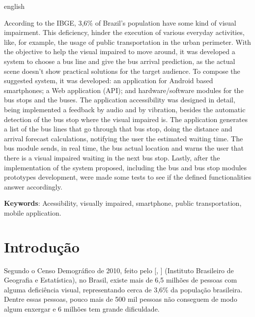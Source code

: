 \documentclass[
	12pt,				%
	oneside,			%
	a4paper,			%
	brazil				%
]{abntex2}
\newcommand{\citecustom}[1]{[\citeauthoronline{#1}, \citeyear{#1}]}
\newcommand*{\BeginNoToc}{%
  \addtocontents{toc}{%
    \edef\protect\SavedTocDepth{\protect\the\protect\value{tocdepth}}%
  }%
  \addtocontents{toc}{%
    \protect\setcounter{tocdepth}{-10}%
  }%
}
\newcommand*{\EndNoToc}{%
  \addtocontents{toc}{%
    \protect\setcounter{tocdepth}{\protect\SavedTocDepth}%
  }%
}
\begin{document}
\begin{resumo}[Abstract] 
\begin{otherlanguage*}{english}

According to the IBGE, 3,6\% of Brazil's population have some kind of visual impairment. This deficiency, hinder the execution of various everyday activities, like, for example, the usage of public transportation in the urban perimeter. With the objective to help the visual impaired to move around, it was developed a system to choose a bus line and give the bus arrival prediction, as the actual scene doesn't show practical solutions for the target audience. To compose the suggested system, it was developed: an application for Android based smartphones; a Web application (API); and hardware/software modules for the bus stops and the buses. The application accessibility was designed in detail, being implemented
a feedback by audio and by vibration, besides the automatic detection of the bus stop where the visual impaired is. The application generates a list of the bus lines that go through that bus stop, doing the distance and arrival forecast calculations, notifying the user the estimated waiting time. The bus module sends, in real time, the bus actual location and warns the user that there is a visual impaired waiting in the next bus stop. Lastly, after the implementation of the system proposed, including the bus and bus stop modules prototypes development, were made some tests to see if the defined functionalities answer accordingly.

\vspace{\onelineskip} 
\noindent \textbf{Keywords}: Acessibility, visually impaired, smartphone, public transportation, mobile application. 
\end{otherlanguage*} 
\end{resumo} 

\BeginNoToc
\tableofcontents*
\EndNoToc

\newpage

\listoffigures\thispagestyle{empty} \newpage

\textual

\chapter{Introdução}

Segundo o Censo Demográfico de 2010, feito pelo \citecustom{ibge} (Instituto Brasileiro de Geografia e Estatística), no Brasil, existe mais de 6,5 milhões de pessoas com alguma deficiência visual, representando cerca de 3,6\% da população brasileira. Dentre essas pessoas, pouco mais de 500 mil pessoas não conseguem de modo algum enxergar e 6 milhões tem grande dificuldade.
\end{document}
